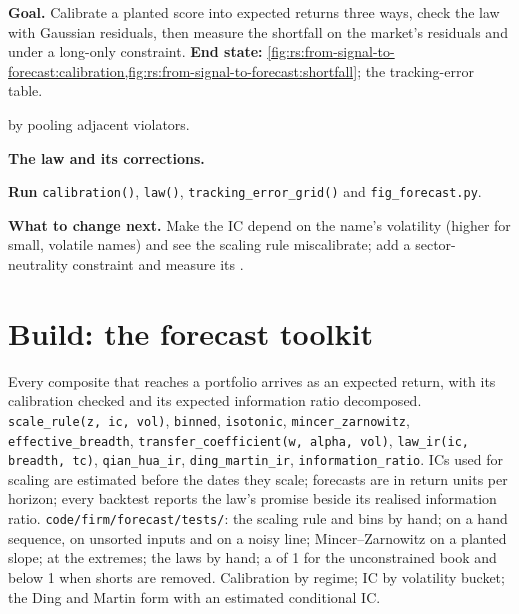 \begin{tutorial}
\textbf{Goal.} Calibrate a planted score into expected returns three ways, check the law with Gaussian residuals, then measure the shortfall on the
market's residuals and under a long-only constraint. \textbf{End state:}
\cref{fig:rs:from-signal-to-forecast:calibration,fig:rs:from-signal-to-forecast:shortfall}; the tracking-error table.
\begin{tutsteps}
\item \textbf{} by pooling adjacent violators.
\label{lst:rs:from-signal-to-forecast:pav}
\item \textbf{The law and its corrections.}
\label{lst:rs:from-signal-to-forecast:law}
\item \textbf{Run} \texttt{calibration()}, \texttt{law()}, \texttt{tracking\_error\_grid()} and \texttt{fig\_forecast.py}.
\end{tutsteps}
\textbf{What to change next.} Make the IC depend on the name's volatility (higher for small, volatile names) and see the scaling rule miscalibrate;
add a sector-neutrality constraint and measure its .
\end{tutorial}

\section{Build: the forecast toolkit}\label{bld:rs:from-signal-to-forecast:forecast}

\begin{build}
 Every composite that reaches a portfolio arrives as an expected return, with its calibration checked and its expected information ratio
decomposed.
 \texttt{scale\_rule(z, ic, vol)}, \texttt{binned}, \texttt{isotonic}, \texttt{mincer\_zarnowitz}, \texttt{effective\_breadth},
\texttt{transfer\_coefficient(w, alpha, vol)}, \texttt{law\_ir(ic, breadth, tc)}, \texttt{qian\_hua\_ir}, \texttt{ding\_martin\_ir},
\texttt{information\_ratio}.
 ICs used for scaling are estimated before the dates they scale; forecasts are in return units per horizon; every backtest reports the
law's promise beside its realised information ratio.
 \texttt{code/firm/forecast/tests/}: the scaling rule and bins by hand;  on a hand sequence, on unsorted
inputs and on a noisy line; Mincer--Zarnowitz on a planted slope;  at the extremes; the laws by hand; a  of 1
for the unconstrained book and below 1 when shorts are removed.
 Calibration by regime; IC by volatility bucket; the Ding and Martin form with an estimated conditional IC.
\end{build}

